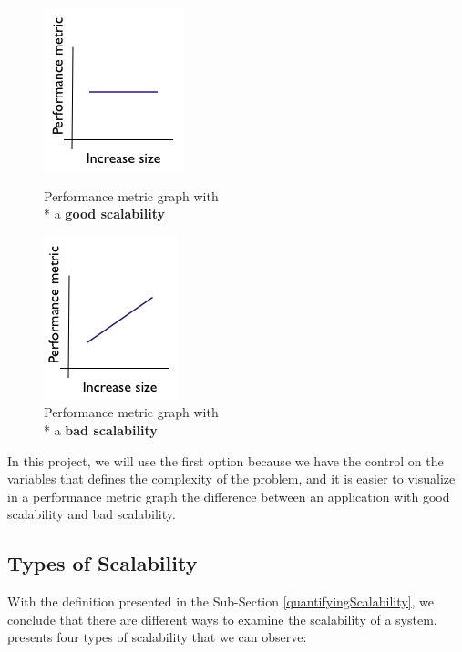 \begin{figure}[ht]
\begin{minipage}[b]{0.5\linewidth}
\centering
\includegraphics[scale=0.7]{images/scalabilitygood}
\caption{Performance metric graph with \\* a \textbf{good scalability}}
\label{fig:goodscalability}
\end{minipage}
\hspace{0.5cm}
\begin{minipage}[b]{0.5\linewidth}
\centering
\includegraphics[scale=0.7]{images/scalabilitybad}
\caption{Performance metric graph with \\* a \textbf{bad scalability}}
\label{fig:badscalability}
\end{minipage}
\end{figure}


In this project, we will use the first option because we have the control on the variables that defines the complexity of the problem, and it is easier to visualize in a performance metric graph the difference between an application with good scalability and bad scalability.

\subsection{Types of Scalability}
With the definition presented in the Sub-Section \ref{quantifyingScalability}, we conclude that there are different ways to examine the scalability of a system. \cite{BONDI} presents four types of scalability that we can observe:

